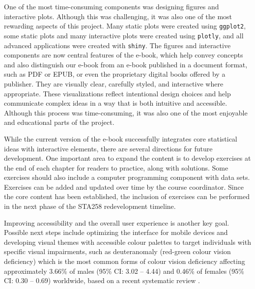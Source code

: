 \documentclass[11pt]{article}
\begin{document}
One of the most time-consuming components was designing figures and interactive plots. 
Although this was challenging, it was also one of the most rewarding aspects of this project.
Many static plots were created using \texttt{ggplot2}, some static plots and many interactive plots were created using \texttt{plotly}, 
and all advanced applications were created with \texttt{shiny}. 
The figures and interactive components are now central features of the e-book, which help convey concepts and also distinguish our e-book from an e-book published in a document format, such as PDF or EPUB, or even the proprietary digital books offered by a publisher.
They are visually clear, carefully styled, and interactive where appropriate. These visualizations reflect intentional design choices and help communicate complex ideas in a way that is both intuitive and accessible. Although this process was time-consuming, it was also one of the most enjoyable and educational parts of the project.


While the current version of the e-book successfully integrates core statistical ideas with interactive elements, there are several directions for future development. 
One important area to expand the content is to develop exercises at the end of each chapter for readers to practice, along with solutions.
Some exercises should also include a computer programming component with data sets.
Exercises can be added and updated over time by the course coordinator.
Since the core content has been established, the inclusion of exercises can be performed in the next phase of the STA258 redevelopment timeline.


Improving accessibility and the overall user experience is another key goal. 
Possible next steps include optimizing the interface for mobile devices and developing visual themes with accessible colour palettes to target individuals with specific visual impairments, such as deuteranomaly (red-green colour vision deficiency) which is the most common forms of colour vision deficiency affecting approximately 3.66\% of males (95\% CI: 3.02 -- 4.44) and 0.46\% of females (95\% CI: 0.30 -- 0.69) worldwide, based on a recent systematic review \cite{Jeong2025}.
\end{document}
